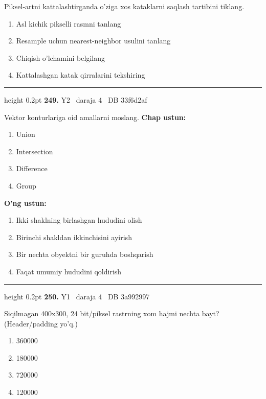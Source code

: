 \documentclass[10pt,a4paper,oneside]{article}
\begin{document}
Piksel-artni kattalashtirganda o'ziga xos kataklarni saqlash tartibini tiklang.
\begin{enumerate}[label=\Alph*),leftmargin=9mm]
\item Asl kichik pikselli rasmni tanlang
\item Resample uchun nearest-neighbor usulini tanlang
\item Chiqish o'lchamini belgilang
\item Kattalashgan katak qirralarini tekshiring
\end{enumerate}
\vspace{2mm}\hrule height 0.2pt \vspace{4mm}
\hypertarget{q249}{\textbf{\color{ink}249.}}  {\color{muted}\scriptsize Y2 \textbullet\ daraja 4 \textbullet\ DB 33f6d2af}
\par
Vektor konturlariga oid amallarni moslang.
\textbf{\footnotesize Chap ustun:}
\begin{enumerate}[label=\arabic*),leftmargin=9mm]
\item Union
\item Intersection
\item Difference
\item Group
\end{enumerate}
\textbf{\footnotesize O'ng ustun:}
\begin{enumerate}[label=\Alph*),leftmargin=9mm]
\item Ikki shaklning birlashgan hududini olish
\item Birinchi shakldan ikkinchisini ayirish
\item Bir nechta obyektni bir guruhda boshqarish
\item Faqat umumiy hududini qoldirish
\end{enumerate}
\vspace{2mm}\hrule height 0.2pt \vspace{4mm}
\hypertarget{q250}{\textbf{\color{ink}250.}}  {\color{muted}\scriptsize Y1 \textbullet\ daraja 4 \textbullet\ DB 3a992997}
\par
Siqilmagan 400x300, 24 bit/piksel rastrning xom hajmi nechta bayt? (Header/padding yo'q.)
\begin{enumerate}[label=\Alph*),leftmargin=9mm]
\item 360000
\item 180000
\item 720000
\item 120000
\end{enumerate}
\end{document}
